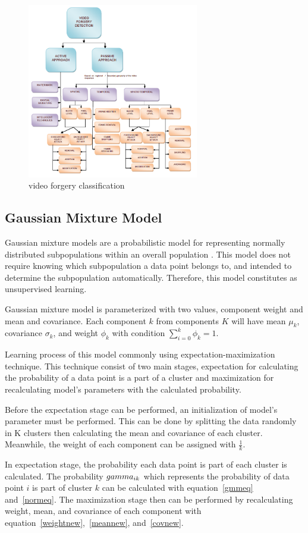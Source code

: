 \documentclass[conference]{IEEEtran}
\begin{document}
\begin{figure}[htbp]
\centerline{\includegraphics[width=75mm,scale=0.5]{forgeryclass.PNG}}
\caption{video forgery classification \cite{b1}}
\label{forgeryclass}
\end{figure}

\subsection{Gaussian Mixture Model}
Gaussian mixture models are a probabilistic model for representing normally distributed subpopulations within an overall population \cite{gmm}. This model does not require knowing which subpopulation a data point belongs to, and intended to determine the subpopulation automatically. Therefore, this model constitutes as unsupervised learning.

Gaussian mixture model is parameterized with two values, component weight and mean and covariance. Each component $k$ from components $K$ will have mean $\mu_k$, covariance $\sigma_k$, and weight $\phi_k$ with condition $\sum_{i=0}^k{\phi_k}=1$.

Learning process of this model commonly using expectation-maximization technique. This technique consist of two main stages, expectation for calculating the probability of a data point is a part of a cluster and maximization for recalculating model's parameters with the calculated probability.

Before the expectation stage can be performed, an initialization of model's parameter must be performed. This can be done by splitting the data randomly in K clusters then calculating the mean and covariance of each cluster. Meanwhile, the weight of each component can be assigned with $\frac{1}{k}$.

In expectation stage, the probability each data point is part of each cluster is calculated. The probability $\\gamma_{ik}$ which represents the probability of data point $i$ is part of cluster $k$ can be calculated with equation~\ref{gmmeq} and~\ref{normeq}. The maximization stage then can be performed by recalculating weight, mean, and covariance of each component with equation~\ref{weightnew},~\ref{meannew}, and~\ref{covnew}.
\end{document}
